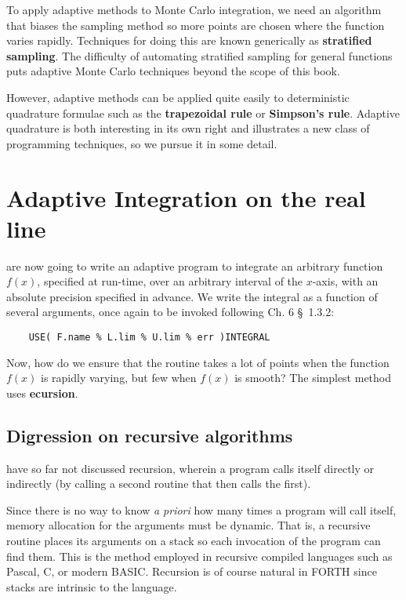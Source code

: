 To apply adaptive methods to Monte Carlo integration, we need an algorithm that biases the sampling method so more points are chosen where the function varies rapidly. Techniques for doing this are known generically as \textbf{stratified sampling}. The difficulty of automating stratified sampling for general functions puts adaptive Monte Carlo techniques beyond the scope of this book.

However, adaptive methods can be applied quite easily to deterministic quadrature formulae such as the \textbf{trapezoidal rule} or \textbf{Simpson’s rule}. Adaptive quadrature is both interesting in its own right and illustrates a new class of programming techniques, so we pursue it in some detail.

\section{Adaptive Integration on the real line}
 are now going to write an adaptive program to integrate an arbitrary function $f(x)$, specified at run-time, over an arbitrary interval of the $x$-axis, with an absolute precision specified in advance. We write the integral as a function of several arguments, once again to be invoked following Ch. 6 \S\ 1.3.2:

\begin{lstlisting}
    USE( F.name % L.lim % U.lim % err )INTEGRAL
\end{lstlisting}

Now, how do we ensure that the routine takes a lot of points when the function $f(x)$ is rapidly varying, but few when $f(x)$ is smooth? The simplest method uses \textbf{ecursion}.

\subsection{Digression on recursive algorithms}
 have so far not discussed recursion, wherein a program calls itself directly or indirectly (by calling a second routine that then calls the ﬁrst).

Since there is no way to know \textit{a priori} how many times a program will call itself, memory allocation for the arguments must be dynamic. That is, a recursive routine places its arguments on a stack so each invocation of the program can ﬁnd them. This is the method employed in recursive compiled languages such as Pascal, C, or modern BASIC. Recursion is of course natural in FORTH since stacks are intrinsic to the language.

